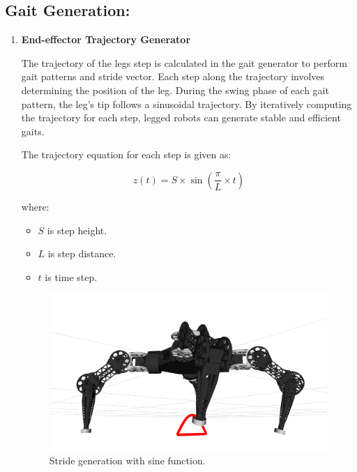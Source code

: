 \subsection{Gait Generation:}

\begin{enumerate}
    \item \textbf{End-effector Trajectory Generator}
    
\hspace{0.5cm}The trajectory of the legs step is calculated in the gait generator to perform gait patterns and stride vector. Each step along the trajectory involves determining the position of the leg. During the swing phase of each gait pattern, the leg's tip follows a sinusoidal trajectory. By iteratively computing the trajectory for each step, legged robots can generate stable and efficient gaits.

The trajectory equation for each step is given as:

\vspace{2mm}
\begin{equation}
    z(t) = \text{{$S$}} \times \sin\left(\frac{{\pi}}{{\text{{$L$}}}} \times \text{{$t$}}\right)
\end{equation}
\vspace{2mm}

where:
\begin{itemize}
    \item $S$ is step height.
    \item $L$ is step distance.
    \item $t$ is time step.
\end{itemize}

\begin{figure}[h]
  \centering
  \includegraphics[width=\linewidth]{./fig/chap4/stride/stride1.png}
  \vspace{2mm}
  \caption{Stride generation with sine function.}\label{stride}
\end{figure}


\end{enumerate}
